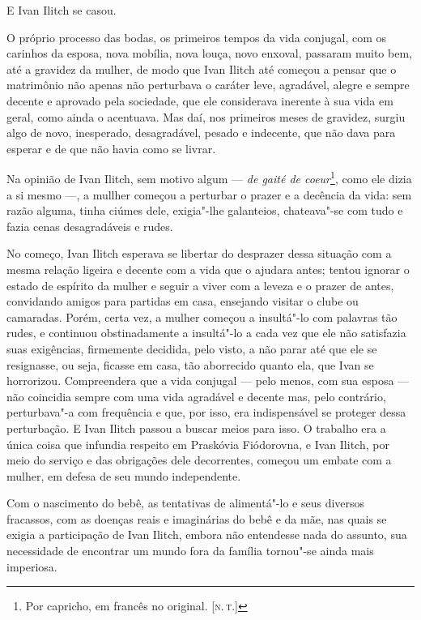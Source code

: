 E Ivan Ilitch se casou.

O próprio processo das bodas, os primeiros tempos da vida conjugal, com
os carinhos da esposa, nova mobília, nova louça, novo enxoval, passaram
muito bem, até a gravidez da mulher, de modo que Ivan Ilitch até começou
a pensar que o matrimônio não apenas não perturbava o caráter leve,
agradável, alegre e sempre decente e aprovado pela sociedade, que ele
considerava inerente à sua vida em geral, como ainda o acentuava. Mas
daí, nos primeiros meses de gravidez, surgiu algo de novo, inesperado,
desagradável, pesado e indecente, que não dava para esperar e de que não
havia como se livrar.

Na opinião de Ivan Ilitch, sem motivo algum --- \emph{de gaité de
coeur}\footnote{Por capricho, em francês no original. {[}\textsc{n.\,t.}{]}},
como ele dizia a si mesmo ---, a mullher começou a perturbar o prazer e a
decência da vida: sem razão alguma, tinha ciúmes dele, exigia"-lhe
galanteios, chateava"-se com tudo e fazia cenas desagradáveis e rudes.

No começo, Ivan Ilitch esperava se libertar do desprazer dessa situação
com a mesma relação ligeira e decente com a vida que o ajudara antes;
tentou ignorar o estado de espírito da mulher e seguir a viver com a
leveza e o prazer de antes, convidando amigos para partidas em casa,
ensejando visitar o clube ou camaradas. Porém, certa vez, a mulher
começou a insultá"-lo com palavras tão rudes, e continuou obstinadamente
a insultá"-lo a cada vez que ele não satisfazia suas exigências,
firmemente decidida, pelo visto, a não parar até que ele se resignasse,
ou seja, ficasse em casa, tão aborrecido quanto ela, que Ivan se
horrorizou. Compreendera que a vida conjugal --- pelo menos, com sua
esposa --- não coincidia sempre com uma vida agradável e decente mas,
pelo contrário, perturbava"-a com frequência e que, por isso, era
indispensável se proteger dessa perturbação. E Ivan Ilitch passou a
buscar meios para isso. O trabalho era a única coisa que infundia
respeito em Praskóvia Fiódorovna, e Ivan Ilitch, por meio do serviço e
das obrigações dele decorrentes, começou um embate com a mulher, em
defesa de seu mundo independente.

Com o nascimento do bebê, as tentativas de alimentá"-lo e seus diversos
fracassos, com as doenças reais e imaginárias do bebê e da mãe, nas
quais se exigia a participação de Ivan Ilitch, embora não entendesse
nada do assunto, sua necessidade de encontrar um mundo fora da família
tornou"-se ainda mais imperiosa.

